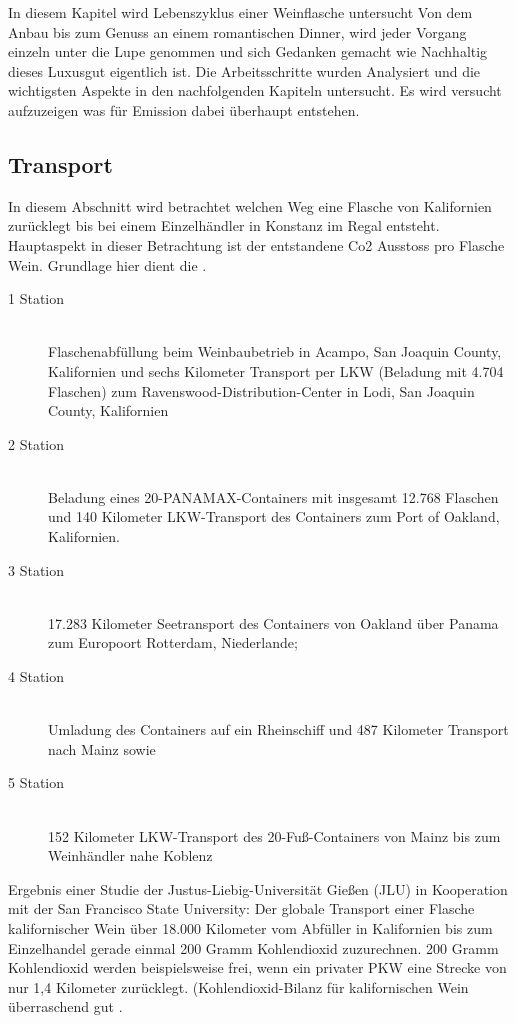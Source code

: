 In diesem Kapitel wird Lebenszyklus einer Weinflasche untersucht Von dem Anbau bis zum Genuss an einem romantischen Dinner, wird jeder Vorgang einzeln unter die Lupe genommen und sich Gedanken gemacht wie Nachhaltig dieses Luxusgut eigentlich ist. Die Arbeitsschritte wurden Analysiert und die wichtigsten Aspekte in den nachfolgenden Kapiteln untersucht. Es wird versucht aufzuzeigen was für Emission dabei überhaupt entstehen.
\subsection{Transport}
In diesem Abschnitt wird betrachtet welchen Weg eine Flasche von Kalifornien zurücklegt bis bei einem Einzelhändler in Konstanz im Regal entsteht. Hauptaspekt in dieser Betrachtung ist der entstandene Co2 Ausstoss pro Flasche Wein. Grundlage hier dient die \cite{_kohlendioxid-bilanz}. 
\begin{description}
	\item[1 Station]\hfill \\
	Flaschenabfüllung beim Weinbaubetrieb in Acampo, San Joaquin County, 			Kalifornien und sechs Kilometer Transport per LKW (Beladung mit 4.704 			Flaschen) zum Ravenswood-Distribution-Center in Lodi, San Joaquin 				County, Kalifornien
	\item[2 Station]\hfill \\
	Beladung eines 20-PANAMAX-Containers mit insgesamt 12.768 Flaschen 			und 140 Kilometer LKW-Transport des Containers zum Port of Oakland, 			Kalifornien.
	\item[3 Station]\hfill \\
		17.283 Kilometer Seetransport des Containers von Oakland über Panama 			zum Europoort Rotterdam, Niederlande;
	\item[4 Station]\hfill \\
		Umladung des Containers auf ein Rheinschiff und 487 Kilometer Transport 			nach Mainz sowie	
	\item[5 Station]\hfill \\ 
	152 Kilometer LKW-Transport des 20-Fuß-Containers von Mainz bis zum 			Weinhändler nahe Koblenz
\end{description}

Ergebnis einer Studie der Justus-Liebig-Universität Gießen (JLU) in Kooperation mit der San Francisco State University: Der globale Transport einer Flasche kalifornischer Wein über 18.000 Kilometer vom Abfüller in Kalifornien bis zum Einzelhandel gerade einmal 200 Gramm Kohlendioxid zuzurechnen. 200 Gramm Kohlendioxid werden beispielsweise frei, wenn ein privater PKW eine Strecke von nur 1,4 Kilometer zurücklegt.  (Kohlendioxid-Bilanz für kalifornischen Wein überraschend gut \cite{_kohlendioxid-bilanz}. 


